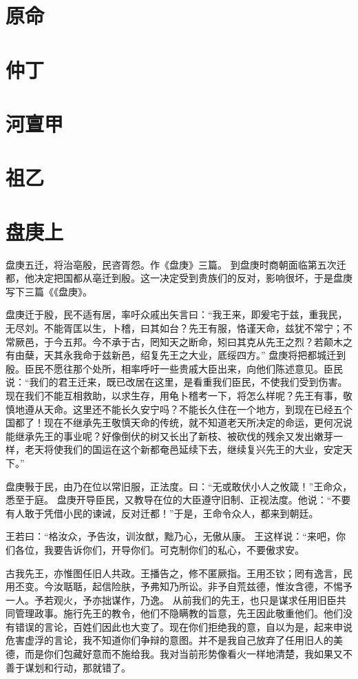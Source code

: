 \documentclass[12pt,UTF8]{ctexbook}
\begin{document}
\chapter{原命}
\chapter{仲丁}
\chapter{河亶甲}
\chapter{祖乙}
\chapter{盘庚上}

盘庚五迁，将治亳殷，民咨胥怨。作《盘庚》三篇。
到盘庚时商朝面临第五次迁都，他决定把国都从亳迁到殷。这一决定受到贵族们的反对，影响很坏，于是盘庚写下三篇《《盘庚》。

盘庚迁于殷，民不适有居，率吁众戚出矢言曰：“我王来，即爰宅于兹，重我民，无尽刘。不能胥匡以生，卜稽，曰其如台？先王有服，恪谨天命，兹犹不常宁；不常厥邑，于今五邦。今不承于古，罔知天之断命，矧曰其克从先王之烈？若颠木之有由蘖，天其永我命于兹新邑，绍复先王之大业，厎绥四方。”
盘庚将把都城迁到殷。臣民不愿往那个处所，相率呼吁一些贵戚大臣出来，向他们陈述意见。臣民说：“我们的君王迁来，既已改居在这里，是看重我们臣民，不使我们受到伤害。现在我们不能互相救助，以求生存，用龟卜稽考一下，将怎么样呢？先王有事，敬慎地遵从天命。这里还不能长久安宁吗？不能长久住在一个地方，到现在已经五个国都了！现在不继承先王敬慎天命的传统，就不知道老天所决定的命运，更何况说能继承先王的事业呢？好像倒伏的树又长出了新枝、被砍伐的残余又发出嫩芽一样，老天将使我们的国运在这个新都奄邑延续下去，继续复兴先王的大业，安定天下。”

盘庚斅于民，由乃在位以常旧服，正法度。曰：“无或敢伏小人之攸箴！”王命众，悉至于庭。
盘庚开导臣民，又教导在位的大臣遵守旧制、正视法度。他说：“不要有人敢于凭借小民的谏诫，反对迁都！”于是，王命令众人，都来到朝廷。

王若曰：“格汝众，予告汝，训汝猷，黜乃心，无傲从康。
王这样说：“来吧，你们各位，我要告诉你们，开导你们。可克制你们的私心，不要傲求安。

古我先王，亦惟图任旧人共政。王播告之，修不匿厥指。王用丕钦；罔有逸言，民用丕变。今汝聒聒，起信险肤，予弗知乃所讼。非予自荒兹德，惟汝含德，不惕予一人。予若观火，予亦拙谋作，乃逸。
从前我们的先王，也只是谋求任用旧臣共同管理政事。施行先王的教令，他们不隐瞒教的旨意，先王因此敬重他们。他们没有错误的言论，百姓们因此也大变了。现在你们拒绝我的意，自以为是，起来申说危害虚浮的言论，我不知道你们争辩的意图。并不是我自己放弃了任用旧人的美德，而是你们包藏好意而不施给我。我对当前形势像看火一样地清楚，我如果又不善于谋划和行动，那就错了。
\end{document}
